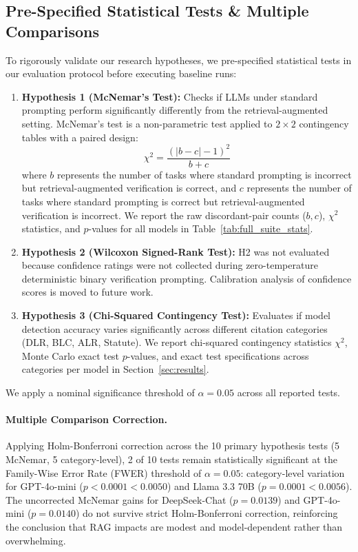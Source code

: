 \documentclass[conference]{IEEEtran}
\begin{document}
\subsection{Pre-Specified Statistical Tests \& Multiple Comparisons}
To rigorously validate our research hypotheses, we pre-specified statistical tests in our evaluation protocol before executing baseline runs:
\begin{enumerate}
\item \textbf{Hypothesis 1 (McNemar's Test):} Checks if LLMs under standard prompting perform significantly differently from the retrieval-augmented setting. McNemar's test is a non-parametric test applied to $2 \times 2$ contingency tables with a paired design:
   \begin{equation}
   \chi^2 = \frac{(|b - c| - 1)^2}{b + c}
   \end{equation}
   where $b$ represents the number of tasks where standard prompting is incorrect but retrieval-augmented verification is correct, and $c$ represents the number of tasks where standard prompting is correct but retrieval-augmented verification is incorrect. We report the raw discordant-pair counts ($b, c$), $\chi^2$ statistics, and $p$-values for all models in Table~\ref{tab:full_suite_stats}.
\item \textbf{Hypothesis 2 (Wilcoxon Signed-Rank Test):} H2 was not evaluated because confidence ratings were not collected during zero-temperature deterministic binary verification prompting. Calibration analysis of confidence scores is moved to future work.
\item \textbf{Hypothesis 3 (Chi-Squared Contingency Test):} Evaluates if model detection accuracy varies significantly across different citation categories (DLR, BLC, ALR, Statute). We report chi-squared contingency statistics $\chi^2$, Monte Carlo exact test $p$-values, and exact test specifications across categories per model in Section~\ref{sec:results}.
\end{enumerate}
We apply a nominal significance threshold of $\alpha = 0.05$ across all reported tests.

\paragraph{Multiple Comparison Correction.} Applying Holm-Bonferroni correction across the 10 primary hypothesis tests (5 McNemar, 5 category-level), 2 of 10 tests remain statistically significant at the Family-Wise Error Rate (FWER) threshold of $\alpha = 0.05$: category-level variation for GPT-4o-mini ($p < 0.0001 < 0.0050$) and Llama 3.3 70B ($p = 0.0001 < 0.0056$). The uncorrected McNemar gains for DeepSeek-Chat ($p=0.0139$) and GPT-4o-mini ($p=0.0140$) do not survive strict Holm-Bonferroni correction, reinforcing the conclusion that RAG impacts are modest and model-dependent rather than overwhelming.
\end{document}
